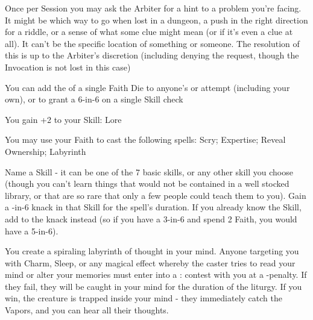 {Once per Session you may ask the Arbiter for a hint to a problem you're facing. It might be which way to go when lost in a dungeon, a push in the right direction for a riddle, or a sense of what some clue might mean (or if it's even a clue at all). It can't be the specific location of something or someone. The resolution of this is  up to the Arbiter's discretion (including denying the request, though the Invocation is not lost in this case)


You can add the \SUMDICE of a single Faith Die to anyone's \RO or \RB attempt (including your own), or to grant a 6-in-6 on a single Skill check





\GOD[
Name=Thoth,
Link=small-god-thoth,
GodOf=God of Knowledge,
Holy=a small book of scripture
]


You gain +2 to your Skill: Lore


You may use your Faith to cast the following spells: Scry; Expertise; Reveal Ownership; Labyrinth

\LITURGY [
  Name= Expertise,
  Link= thoth-liturgy-expertise,
  Paradigm= Mind ,
  Save=  N ,
  Duration= \SUMDICE Minutes ,
  Counter=  n/a  ,
  Keywords= None ,
  Target=   Self
]



Name a Skill - it can be one of the 7 basic skills, or any other skill you choose (though you can't learn things that would not be contained in a well stocked library, or that are so rare that only a few people could teach them to you).  Gain a \DICE-in-6 {knack} in that Skill for the spell's duration.  If you already know the Skill, add \DICE to the {knack} instead (so if you have a 3-in-6 and spend 2 Faith, you would have a 5-in-6).

\LITURGY [
  Name= Labyrinth,
  Link=thoth-liturgy-labyrinth,
  Paradigm= Mind ,
  Save=  N ,
  Duration= Combat or \SUMDICE Minutes ,
  Counter=  n/a  ,
  Keywords= None ,
  Target=   Self
]



You create a spiraling labyrinth of thought in your mind.  Anyone targeting you with Charm, Sleep, or any magical effect whereby the caster tries to read your mind or alter your memories must enter into a \RB : \FOC contest with you at a -\DICE penalty.  If they fail, they will be caught in your mind for the duration of the liturgy.  If you win, the creature is trapped inside your mind - they immediately catch the Vapors, and you can hear all their thoughts.

}
